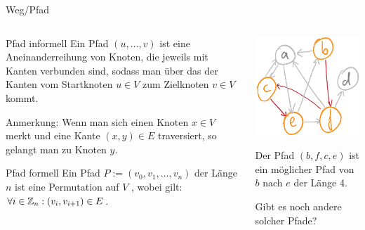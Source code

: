 \begin{frame}{Weg/Pfad}
	\begin{columns}
		\begin{column}{0.6\textwidth}
			\begin{block}{Pfad informell}
				Ein Pfad $(u,...,v)$ ist eine Aneinanderreihung von Knoten\ip, die jeweils mit Kanten verbunden sind\ip, sodass man über das  der Kanten vom Startknoten $u\in V$ zum Zielknoten $v\in V$ kommt.
			\end{block}
			
			\bp
			Anmerkung: Wenn man sich einen Knoten $x \in V$ merkt und eine Kante $(x,y) \in E$ traversiert, so gelangt man zu Knoten $y$.
			\bp
			
			\begin{block}{Pfad formell}
				Ein Pfad $P := (v_0, v_1, ..., v_n)$ der Länge $n$ \ip ist eine Permutation auf $V$ \ip, wobei gilt: \ip $\forall i \in \mathbb{Z}_n: (v_i, v_{i+1}) \in E$.
			\end{block}	
		\end{column}
		
		\begin{column}{0.4\textwidth}
			\bp
			\includegraphics[scale=0.3]{images/graph_pfad.png}
			
			\ip Der Pfad $(b,f,c,e)$ ist ein möglicher Pfad von $b$ nach $e$ der Länge 4.
			
			\ip Gibt es noch andere solcher Pfade?
		\end{column}
	\end{columns}
\end{frame}

